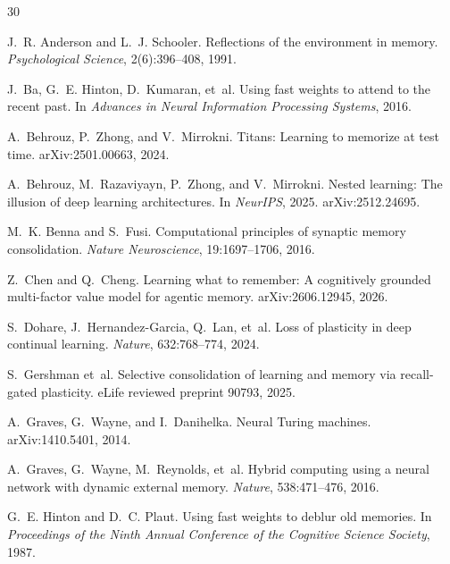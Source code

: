 \documentclass[11pt]{article}
\begin{document}

\begin{thebibliography}{30}

J.~R. Anderson and L.~J. Schooler.
\newblock Reflections of the environment in memory.
\newblock \emph{Psychological Science}, 2(6):396--408, 1991.

J.~Ba, G.~E. Hinton, D.~Kumaran, et~al.
\newblock Using fast weights to attend to the recent past.
\newblock In \emph{Advances in Neural Information Processing Systems}, 2016.

A.~Behrouz, P.~Zhong, and V.~Mirrokni.
\newblock Titans: Learning to memorize at test time.
\newblock arXiv:2501.00663, 2024.

A.~Behrouz, M.~Razaviyayn, P.~Zhong, and V.~Mirrokni.
\newblock Nested learning: The illusion of deep learning architectures.
\newblock In \emph{NeurIPS}, 2025. arXiv:2512.24695.

M.~K. Benna and S.~Fusi.
\newblock Computational principles of synaptic memory consolidation.
\newblock \emph{Nature Neuroscience}, 19:1697--1706, 2016.

Z.~Chen and Q.~Cheng.
\newblock Learning what to remember: A cognitively grounded multi-factor value model for agentic
memory.
\newblock arXiv:2606.12945, 2026.

S.~Dohare, J.~Hernandez-Garcia, Q.~Lan, et~al.
\newblock Loss of plasticity in deep continual learning.
\newblock \emph{Nature}, 632:768--774, 2024.

S.~Gershman et~al.
\newblock Selective consolidation of learning and memory via recall-gated plasticity.
\newblock eLife reviewed preprint 90793, 2025.

A.~Graves, G.~Wayne, and I.~Danihelka.
\newblock Neural Turing machines.
\newblock arXiv:1410.5401, 2014.

A.~Graves, G.~Wayne, M.~Reynolds, et~al.
\newblock Hybrid computing using a neural network with dynamic external memory.
\newblock \emph{Nature}, 538:471--476, 2016.

G.~E. Hinton and D.~C. Plaut.
\newblock Using fast weights to deblur old memories.
\newblock In \emph{Proceedings of the Ninth Annual Conference of the Cognitive Science Society}, 1987.


\end{thebibliography}
\end{document}
